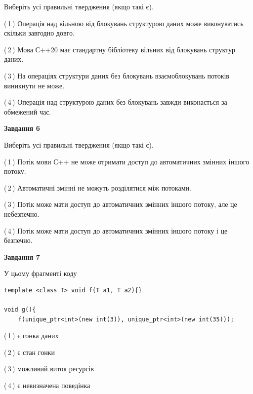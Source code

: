 \documentclass[12pt, ukrainian]{article}
\begin{document}
\begin {large}
{Виберіть усі правильні твердження (якщо такі є).\par
\vspace{2mm}

(\,1\,) Операція над вільною від блокувань структурою даних може виконуватись скільки завгодно довго.%

(\,2\,) Мова С++20 має стандартну бібліотеку вільних від блокувань структур даних.%

(\,3\,) На операціях структури даних без блокувань взаємоблокувань потоків виникнути не може.%

(\,4\,) Операція над структурою даних без блокувань завжди виконається за обмежений час.%
\newpage


\begin{center}
\textbf{Завдання 6}
\end{center}

Виберіть усі правильні твердження (якщо такі є).\par
\vspace{2mm}

(\,1\,) Потік мови С++ не може отримати доступ до автоматичних змінних іншого потоку.%

(\,2\,) Автоматичні змінні не можуть розділятися між потоками.%

(\,3\,) Потік може мати доступ до автоматичних змінних іншого потоку, але це небезпечно.%

(\,4\,) Потік може мати доступ до автоматичних змінних іншого потоку і це безпечно.%


\begin{center}
\textbf{Завдання 7}
\end{center}

У цьому фрагменті коду
\begin{verbatim}
template <class T> void f(T a1, T a2){}

void g(){
    f(unique_ptr<int>(new int(3)), unique_ptr<int>(new int(35)));
\end{verbatim}

(\,1\,) є гонка даних%

(\,2\,) є стан гонки%

(\,3\,) можливий виток ресурсів%

(\,4\,) є невизначена поведінка%

}
\end {large}

\vspace{4mm}
\newpage
\end{document}
